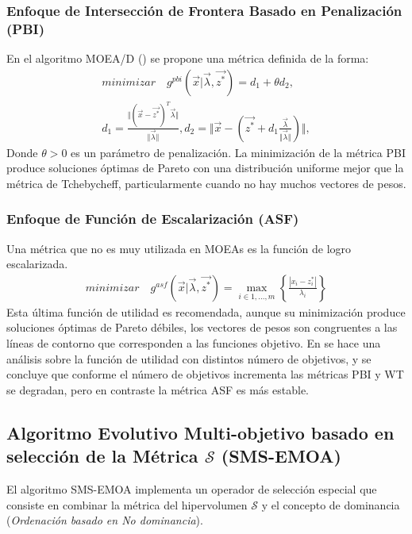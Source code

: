 \subsubsection*{Enfoque de Intersección de Frontera Basado en Penalización (PBI)}
En el algoritmo MOEA/D (\cite{Joel:MOEAD}) se propone una métrica definida de la forma:
\begin{equation}
\label{eqn:pbi}
\begin{split}
minimizar \quad g^{pbi}( \vec{x} | \vec{\lambda}, \vec{z^*}) = d_1 + \theta d_2, \\
d_1 = \frac{ \Vert ( \vec{x} - \vec{z^*}  )^T \vec{\lambda}  \Vert}{ \Vert \vec{\lambda} \Vert },
d_2 = \Vert \vec{x} - ( \vec{z^*} + d_1 \frac{\vec{\lambda}}{  \Vert \vec{\lambda}  \Vert  }  )  \Vert,
\end{split}
\end{equation}
Donde $\theta > 0$ es un parámetro de penalización.
La minimización de la métrica PBI produce soluciones óptimas de Pareto con una distribución uniforme mejor que la métrica de Tchebycheff, particularmente cuando no hay muchos vectores de pesos.

\subsubsection*{Enfoque de Función de Escalarización (ASF)}
Una métrica que no es muy utilizada en MOEAs es la función de logro escalarizada.
\begin{equation}
\label{eqn:ASF}
\begin{split}
minimizar \quad g^{asf}( \vec{x} | \vec{\lambda}, \vec{z^*} ) = \max\limits_{i \in {1,...,m}} \left \{ \frac{ |x_i - z^*_i| }{ \lambda_i}  \right \}
\end{split}
\end{equation}
Esta última función de utilidad es recomendada, aunque su minimización produce soluciones óptimas de Pareto débiles, los vectores de pesos son congruentes a las líneas de contorno que corresponden a las funciones objetivo.
%
En \cite{Joel:MOMBI-II} se hace una análisis sobre la función de utilidad con distintos número de objetivos, y se concluye que conforme el número de objetivos incrementa las métricas PBI y WT se degradan, pero en contraste la métrica ASF es más estable. 
%

\subsection{Algoritmo Evolutivo Multi-objetivo basado en selección de la Métrica $\mathscr{S}$ (SMS-EMOA)}
El algoritmo SMS-EMOA 
 implementa un operador de selección especial que consiste en combinar la métrica del hipervolumen $\mathscr{S}$ y el concepto de dominancia (\textit{Ordenación basado en No dominancia}). 
%

